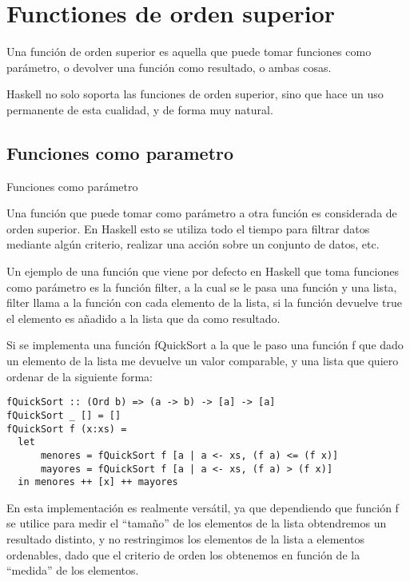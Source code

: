 
\section{Functiones de orden superior} %
\label{sec:functiones_de_orden_superior}


Una función de orden superior es aquella que puede tomar funciones como parámetro, o devolver una función como resultado, o ambas cosas.

Haskell no solo soporta las funciones de orden superior, sino que hace un uso permanente de esta cualidad, y de forma muy natural.


\subsection{Funciones como parametro} %
\label{sub:funciones_como_parametro}

Funciones como parámetro

Una función que puede tomar como parámetro a otra función es considerada de orden superior. En Haskell esto se utiliza todo el tiempo para filtrar datos mediante algún criterio, realizar una acción sobre un conjunto de datos, etc.

Un ejemplo de una función que viene por defecto en Haskell que toma funciones como parámetro es la función filter, a la cual se le pasa una función y una lista, filter llama a la función con cada elemento de la lista, si la función devuelve true el elemento es añadido a la lista que da como resultado.

Si se implementa una función fQuickSort a la que le paso una función f que dado un elemento de la lista me devuelve un valor comparable, y una lista que quiero ordenar de la siguiente forma:

\begin{lstlisting}
fQuickSort :: (Ord b) => (a -> b) -> [a] -> [a]
fQuickSort _ [] = []
fQuickSort f (x:xs) =
  let
      menores = fQuickSort f [a | a <- xs, (f a) <= (f x)]
      mayores = fQuickSort f [a | a <- xs, (f a) > (f x)]
  in menores ++ [x] ++ mayores
\end{lstlisting}

En esta implementación es realmente versátil, ya que dependiendo que función f se utilice para medir el “tamaño” de los elementos de la lista obtendremos un resultado distinto, y no restringimos los elementos de la lista a elementos ordenables, dado que el criterio de orden los obtenemos en función de la “medida” de los elementos.

